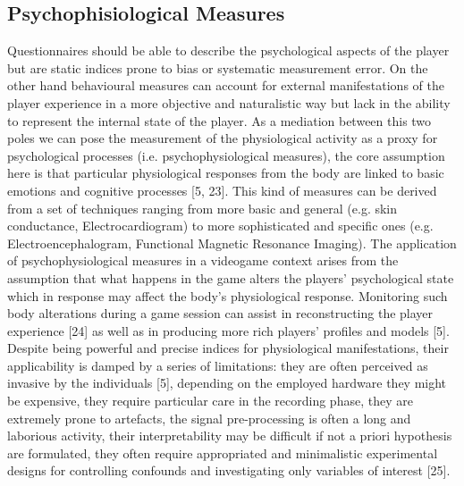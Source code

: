     \subsection{Psychophisiological Measures}
    \label{psychophisio}
    Questionnaires should be able to describe the psychological aspects of the player but are static indices prone to bias or systematic measurement error. On the other hand behavioural measures can account for external manifestations of the player experience in a more objective and naturalistic way but lack in the ability to represent the internal state of the player. As a mediation between this two poles we can pose the measurement of the physiological activity as a proxy for psychological processes (i.e. psychophysiological measures), the core assumption here is that particular physiological responses from the body are linked to basic emotions and cognitive processes [5, 23]. This kind of measures can be derived from a set of techniques ranging from more basic and general (e.g. skin conductance, Electrocardiogram) to more sophisticated and specific ones (e.g. Electroencephalogram, Functional Magnetic Resonance Imaging). The application of psychophysiological measures in a videogame context arises from the assumption that what happens in the game alters the players’ psychological state which in response may affect the body’s physiological response.  Monitoring such body alterations during a game session can assist in reconstructing the player experience [24] as well as in producing more rich players’ profiles and models [5]. Despite being powerful and precise indices for physiological manifestations, their applicability is damped by a series of limitations: they are often perceived as invasive by the individuals [5], depending on the employed hardware they might be expensive, they require particular care in the recording phase, they are extremely prone to artefacts, the signal pre-processing is often a long and laborious activity, their interpretability may be difficult if not a priori hypothesis are formulated, they often require appropriated and minimalistic experimental designs for controlling confounds and investigating only variables of interest [25].
